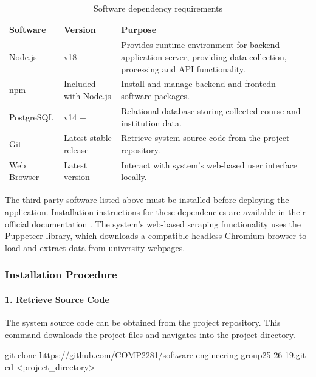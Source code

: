 \begin{table}[h]
\centering
\begin{tabularx}{\textwidth}{@{} l l X @{}}
\toprule
\textbf{Software} & \textbf{Version} &\textbf{Purpose} \\
\midrule

Node.js & v18 + & Provides runtime environment for backend application server, providing data collection, processing and API functionality. \\

npm & Included with Node.js & Install and manage backend and frontedn software packages. \\

PostgreSQL & v14 + & Relational database storing collected course and institution data. \\

Git & Latest stable release & Retrieve system source code from the project repository. \\

Web Browser & Latest version & Interact with system's web-based user interface locally. \\

\bottomrule
\end{tabularx}
\caption{Software dependency requirements}
\end{table}

The third-party software listed above must be installed before deploying the application. Installation instructions for these dependencies are available in their official documentation \cite{git, nodejs, postgresql}.
The system's web-based scraping functionality uses the Puppeteer library, which downloads a compatible headless Chromium browser to load and extract data from university webpages. 

\subsubsection{Installation Procedure}

\paragraph{1. Retrieve Source Code} The system source code can be obtained from the project repository. This command downloads the project files and navigates into the project directory.

\begin{commandbox}
git clone https://github.com/COMP2281/software-engineering-group25-26-19.git \\
cd \textless project\_directory\textgreater
\end{commandbox}

